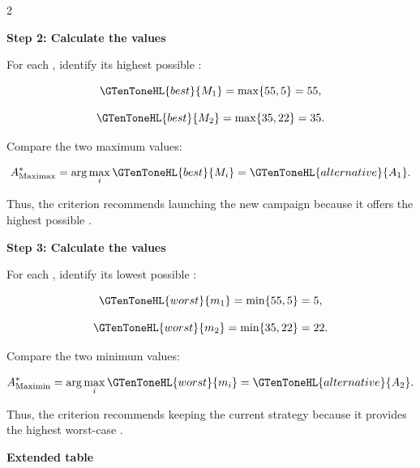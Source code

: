 	\noindent
	\setlength{\columnseprule}{0.4pt}
	
	\begin{multicols}{2}
		\vspace{0pt}
		
		\textbf{Step 2: Calculate the  values}
		
		For each , identify its highest possible :
		
		\[
		\GTenToneHL{best}{M_1}
		=
		\max\{55,5\}
		=
		55,
		\]
		
		\[
		\GTenToneHL{best}{M_2}
		=
		\max\{35,22\}
		=
		35.
		\]
		
		Compare the two maximum values:
		
		\[
		A^*_{\mathrm{Maximax}}
		=
		\arg\max_i \GTenToneHL{best}{M_i}
		=
		\GTenToneHL{alternative}{A_1}.
		\]
		
		Thus, the  criterion recommends launching the new campaign because it offers the highest possible .
		
		\columnbreak
		
		\textbf{Step 3: Calculate the  values}
		
		For each , identify its lowest possible :
		
		\[
		\GTenToneHL{worst}{m_1}
		=
		\min\{55,5\}
		=
		5,
		\]
		
		\[
		\GTenToneHL{worst}{m_2}
		=
		\min\{35,22\}
		=
		22.
		\]
		
		Compare the two minimum values:
		
		\[
		A^*_{\mathrm{Maximin}}
		=
		\arg\max_i \GTenToneHL{worst}{m_i}
		=
		\GTenToneHL{alternative}{A_2}.
		\]
		
		Thus, the  criterion recommends keeping the current strategy because it provides the highest worst-case .
		
	\end{multicols}
	
	\setlength{\columnseprule}{0pt}
	
	\textbf{Extended  table}
	
